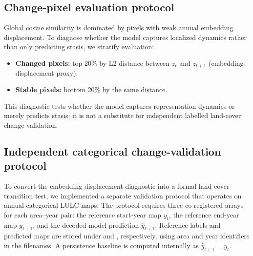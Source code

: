 \documentclass{article}
\begin{document}
\subsection{Change-pixel evaluation protocol}

Global cosine similarity is dominated by pixels with weak annual embedding displacement. To diagnose whether the model captures localized dynamics rather than only predicting stasis, we stratify evaluation:
\begin{itemize}
\item \textbf{Changed pixels:} top 20\% by L2 distance between $z_t$ and $z_{t+1}$ (embedding-displacement proxy).
\item \textbf{Stable pixels:} bottom 20\% by the same distance.
\end{itemize}
This diagnostic tests whether the model captures representation dynamics or merely predicts stasis; it is not a substitute for independent labelled land-cover change validation.

\subsection{Independent categorical change-validation protocol}
\label{sec:independent_change_protocol}

To convert the embedding-displacement diagnostic into a formal land-cover transition test, we implemented a separate validation protocol that operates on annual categorical LULC maps. The protocol requires three co-registered arrays for each area--year pair: the reference start-year map $y_t$, the reference end-year map $y_{t+1}$, and the decoded model prediction $\hat{y}_{t+1}$. Reference labels and predicted maps are stored under  and , respectively, using area and year identifiers in the filenames. A persistence baseline is computed internally as $\hat{y}_{t+1}=y_t$.
\end{document}
